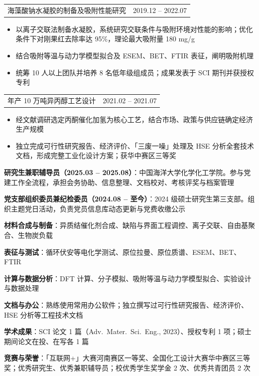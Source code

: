 \documentclass[11pt,a4paper]{ctexart}
\makeatletter
\newcommand{\ressection}[1]{%
  \vspace{0.52em}%
  \noindent{\hei\large\bfseries\color{accent}#1}\par
  \vspace{-0.55em}%
  \noindent{\color{accent}\rule{\linewidth}{1pt}}\par
  \vspace{0.10em}%
}
\newcommand{\entry}[3]{%
  \vspace{0.14em}%
  \noindent\begin{tabularx}{\linewidth}{@{}X@{}r@{}}
    {\songb #1}\ifblank{#3}{}{\hspace{0.7em}{\small #3}} & {\small #2} \\
  \end{tabularx}%
}
\newenvironment{bullets}{%
  \begin{itemize}[leftmargin=1.0em,itemsep=0.10em,topsep=0.10em,parsep=0pt,%
                  partopsep=0pt,label=\textbullet]%
}{\end{itemize}}
\newcommand{\skillrow}[2]{%
  \noindent\textbf{#1}：#2\par\vspace{0.04em}%
}
\makeatother
\begin{document}
\ressection{项目经历}

\entry{海藻酸钠水凝胶的制备及吸附性能研究}{2019.12 -- 2022.07}{项目负责人~|~河南工业大学 党丹老师课题组}
\begin{bullets}
  \item 以离子交联法制备水凝胶，系统研究交联条件与吸附环境对性能的影响；优化条件下对刚果红去除率达 95\%，理论最大吸附量 180 mg/g
  \item 结合吸附等温与动力学模型拟合及 ESEM、BET、FTIR 表征，阐明吸附机理
  \item 统筹 10 人以上团队并培养 8 名低年级组成员；成果发表于 SCI 期刊并获授权专利
\end{bullets}

\entry{年产 10 万吨异丙醇工艺设计}{2021.02 -- 2021.07}{第十五届全国大学生化工设计大赛~|~小组成员}
\begin{bullets}
  \item 经文献调研选定丙酮催化加氢为核心工艺，结合市场、政策与供应链确定经济生产规模
  \item 独立完成可行性研究报告、经济评价、「三废一噪」处理及 HSE 分析全套技术文档，形成完整工业化设计方案；获华中赛区三等奖
\end{bullets}

\ressection{学生工作}

\skillrow{研究生兼职辅导员（2025.03 -- 2025.08）}%
  {中国海洋大学化学化工学院。参与党建工作全流程，承担会务协助、信息整理、文档校对、考核评奖与档案管理}
\skillrow{党支部组织委员兼纪检委员（2024.08 -- 至今）}%
  {2024 级硕士研究生第三支部。组织主题党日活动，负责党员信息库动态更新与党费收缴公示}

\ressection{专业技能}

\skillrow{材料合成与制备}{异质结催化剂合成、缺陷与界面工程调控、离子交联、自由基聚合、生物炭负载}
\skillrow{表征与测试}{循环伏安等电化学测试、原位拉曼、原位质谱、ESEM、BET、FTIR}
\skillrow{计算与数据分析}{DFT 计算、分子模拟、吸附等温与动力学模型拟合、实验设计与数据处理}
\skillrow{文档与办公}{熟练使用常用办公软件；独立撰写过可行性研究报告、经济评价、HSE 分析等工程技术文档}

\ressection{荣誉与成果}

\skillrow{学术成果}{SCI 论文 1 篇（Adv.\ Mater.\ Sci.\ Eng., 2023）、授权专利 1 项；硕士期间论文在投、在写各 1 篇}
\skillrow{竞赛与荣誉}{「互联网+」大赛河南赛区一等奖、全国化工设计大赛华中赛区三等奖；优秀研究生、优秀兼职辅导员；校优秀学生奖学金 2 次、优秀共青团员 2 次}
\end{document}
